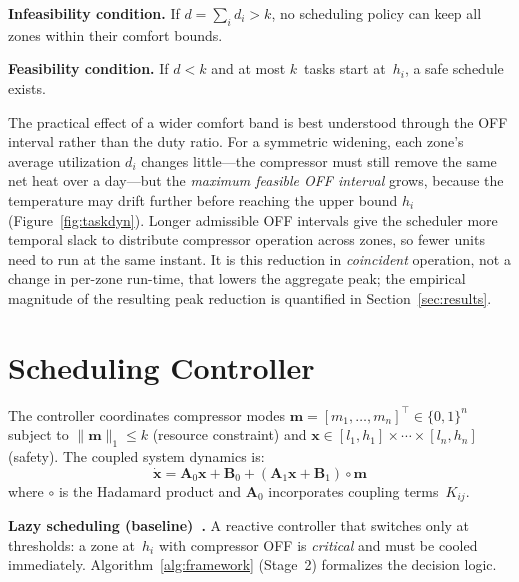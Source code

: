\documentclass[12pt,a4paper]{article}
\begin{document}
\textbf{Infeasibility condition.} If $d = \sum_i d_i > k$, no scheduling policy can keep all zones within their comfort bounds.

\textbf{Feasibility condition.} If $d < k$ and at most $k$~tasks start at~$h_i$, a safe schedule exists.

\noindent The practical effect of a wider comfort band is best understood through the OFF interval rather than the duty ratio. For a symmetric widening, each zone's average utilization $d_i$ changes little---the compressor must still remove the same net heat over a day---but the \emph{maximum feasible OFF interval} grows, because the temperature may drift further before reaching the upper bound $h_i$ (Figure~\ref{fig:taskdyn}). Longer admissible OFF intervals give the scheduler more temporal slack to distribute compressor operation across zones, so fewer units need to run at the same instant. It is this reduction in \emph{coincident} operation, not a change in per-zone run-time, that lowers the aggregate peak; the empirical magnitude of the resulting peak reduction is quantified in Section~\ref{sec:results}.

\section{Scheduling Controller}
\label{sec:scheduling}

The controller coordinates compressor modes $\mathbf{m} = [m_1, \ldots, m_n]^\top \in \{0,1\}^n$ subject to $\|\mathbf{m}\|_1 \leq k$ (resource constraint) and $\mathbf{x} \in [l_1,h_1] \times \cdots \times [l_n,h_n]$ (safety). The coupled system dynamics is:
\begin{equation}
\dot{\mathbf{x}} = \mathbf{A}_0 \mathbf{x} + \mathbf{B}_0 + (\mathbf{A}_1 \mathbf{x} + \mathbf{B}_1) \circ \mathbf{m}
\label{eq:sys}
\end{equation}
where $\circ$ is the Hadamard product and $\mathbf{A}_0$ incorporates coupling terms~$K_{ij}$.

\textbf{Lazy scheduling (baseline)~\cite{ref40}.} A reactive controller that switches only at thresholds: a zone at~$h_i$ with compressor OFF is \textit{critical} and must be cooled immediately. Algorithm~\ref{alg:framework} (Stage~2) formalizes the decision logic.
\end{document}
